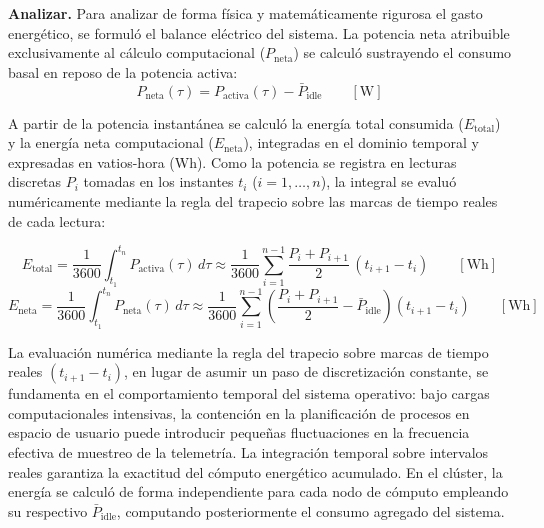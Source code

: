 \documentclass[12pt,oneside,spanish]{book}
\begin{document}
    \textbf{Analizar.} Para analizar de forma física y matemáticamente rigurosa el gasto energético, se formuló el balance eléctrico del sistema. La potencia neta atribuible exclusivamente al cálculo computacional ($P_{\text{neta}}$) se calculó sustrayendo el consumo basal en reposo de la potencia activa:
    \begin{equation}
        P_{\text{neta}}(\tau) = P_{\text{activa}}(\tau) - \bar{P}_{\text{idle}} \qquad [\text{W}]
        \label{eq:potencia_neta}
    \end{equation}
    
    A partir de la potencia instantánea se calculó la energía total consumida ($E_{\text{total}}$) y la energía neta computacional ($E_{\text{neta}}$), integradas en el dominio temporal y expresadas en vatios-hora (Wh). Como la potencia se registra en lecturas discretas $P_i$ tomadas en los instantes $t_i$ ($i = 1, \dots, n$), la integral se evaluó numéricamente mediante la regla del trapecio sobre las marcas de tiempo reales de cada lectura:
    
    \begin{equation}
        E_{\text{total}} = \frac{1}{3600}\int_{t_1}^{t_n} P_{\text{activa}}(\tau)\,d\tau \approx \frac{1}{3600}\sum_{i=1}^{n-1} \frac{P_{i} + P_{i+1}}{2}\,(t_{i+1} - t_{i}) \qquad [\text{Wh}]
        \label{eq:energia_total}
    \end{equation}
    \begin{equation}
        E_{\text{neta}} = \frac{1}{3600}\int_{t_1}^{t_n} P_{\text{neta}}(\tau)\,d\tau \approx \frac{1}{3600}\sum_{i=1}^{n-1} \left(\frac{P_{i} + P_{i+1}}{2} - \bar{P}_{\text{idle}}\right)(t_{i+1} - t_{i}) \qquad [\text{Wh}]
        \label{eq:energia_neta}
    \end{equation}
    
    La evaluación numérica mediante la regla del trapecio sobre marcas de tiempo reales $(t_{i+1} - t_{i})$, en lugar de asumir un paso de discretización constante, se fundamenta en el comportamiento temporal del sistema operativo: bajo cargas computacionales intensivas, la contención en la planificación de procesos en espacio de usuario puede introducir pequeñas fluctuaciones en la frecuencia efectiva de muestreo de la telemetría. La integración temporal sobre intervalos reales garantiza la exactitud del cómputo energético acumulado. En el clúster, la energía se calculó de forma independiente para cada nodo de cómputo empleando su respectivo $\bar{P}_{\text{idle}}$, computando posteriormente el consumo agregado del sistema.
\newpage
\end{document}
